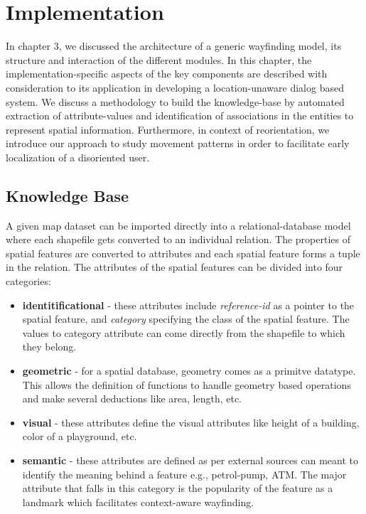 \documentclass{iitkthesis}
\begin{document}
 \chapter{Implementation}
In chapter 3, we discussed the architecture of a generic wayfinding model, its structure and interaction of the different modules. In this chapter, the implementation-specific aspects of the key components are described with consideration to its application in developing a location-unaware dialog based system. We discuss a methodology to build the knowledge-base by automated extraction of attribute-values and identification of associations in the entities to represent spatial information. Furthermore, in context of reorientation, we introduce our approach to study movement patterns in order to facilitate early localization of a disoriented user.

 \section{Knowledge Base}
  \label{sec:kbase}
A given map dataset can be imported directly into a relational-database model where each shapefile gets converted to an individual relation. The properties of spatial features are converted to attributes and each spatial feature forms a tuple in the relation. The attributes of the spatial features can be divided into four categories:
\begin{itemize}
  \item \textbf{identitificational} - these attributes include \textit{reference-id} as a pointer to the spatial feature, and \textit{category} specifying the class of the spatial feature. The values to category attribute can come directly from the shapefile to which they belong.
  \item \textbf{geometric} - for a spatial database, geometry comes as a primitve datatype. This allows the definition of functions to handle geometry based operations and make several deductions like area, length, etc.
  \item \textbf{visual} -  these attributes define the visual attributes like height of a building, color of a playground, etc.
  \item \textbf{semantic} - these attributes are defined as per external sources can meant to identify the meaning behind a feature e.g., petrol-pump, ATM.  The major attribute that falls in this category is the popularity of the feature as a landmark which facilitates context-aware wayfinding.
\end{itemize}
\end{document}
